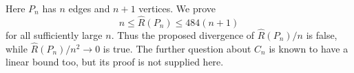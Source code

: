 Here $P_n$ has $n$ edges and $n+1$ vertices. We prove
\[
 n\leq\widehat R(P_n)\leq484(n+1)
\]
for all sufficiently large $n$. Thus the proposed divergence of $\widehat R(P_n)/n$ is false, while $\widehat R(P_n)/n^2\to0$ is true. The further question about $C_n$ is known to have a linear bound too, but its proof is not supplied here.
